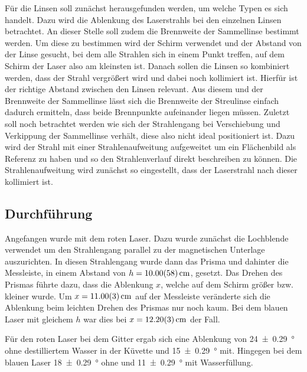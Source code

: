 			Für die Linsen soll zunächst herausgefunden werden, um welche Typen es sich handelt.
			Dazu wird die Ablenkung des Laserstrahls bei den einzelnen Linsen betrachtet.
			An dieser Stelle soll zudem die Brennweite der Sammellinse bestimmt werden.
			Um diese zu bestimmen wird der Schirm verwendet und der Abstand von der Linse gesucht, bei dem alle Strahlen sich in einem Punkt treffen, auf dem Schirm der Laser also am kleinsten ist. 
			Danach sollen die Linsen so kombiniert werden, dass der Strahl vergrößert wird und dabei noch kollimiert ist.
			Hierfür ist der richtige Abstand zwischen den Linsen relevant.
			Aus diesem und der Brennweite der Sammellinse lässt sich die Brennweite der Streulinse einfach dadurch ermitteln, dass beide Brennpunkte aufeinander liegen müssen.  
			Zuletzt soll noch betrachtet werden wie sich der Strahlengang bei Verschiebung und Verkippung der Sammellinse verhält, diese also nicht ideal positioniert ist.
			Dazu wird der Strahl mit einer Strahlenaufweitung aufgeweitet um ein Flächenbild als Referenz zu haben und so den Strahlenverlauf direkt beschreiben zu können.
			Die Strahlenaufweitung wird zunächst so eingestellt, dass der Laserstrahl nach dieser kollimiert ist.
			
	\subsection{Durchführung}
		
		Angefangen wurde mit dem roten Laser.
		Dazu wurde zunächst die Lochblende verwendet um den Strahlengang parallel zu der magnetischen Unterlage auszurichten.
		In diesen Strahlengang wurde dann das Prisma und dahinter die Messleiste, in einem Abstand von $h = \SI{10+-0,58}{\centi\meter}$, gesetzt.
		Das Drehen des Prismas führte dazu, dass die Ablenkung $x$, welche auf dem Schirm größer bzw. kleiner wurde.
		Um $x = \SI{11,0+-0,03}{\centi\meter}$ auf der Messleiste veränderte sich die Ablenkung beim leichten Drehen des Prismas nur noch kaum.
		Bei dem blauen Laser mit gleichem $h$ war dies bei $x = \SI{12,2+-0,03}{\centi\meter}$ der Fall. 
		
		Für den roten Laser bei dem Gitter ergab sich eine Ablenkung von \SI{24+-0,29}{\degree} ohne destilliertem Wasser in der Küvette und \SI{15+-0,29}{\degree} mit.
		Hingegen bei dem blauen Laser \SI{18+-0,29}{\degree} ohne und \SI{11+-0,29}{\degree} mit Wasserfüllung.
		

